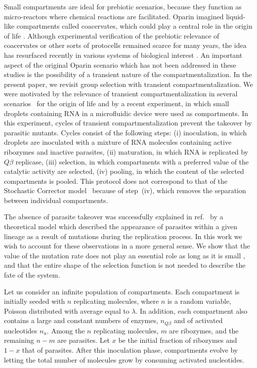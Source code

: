 \documentclass[twocolumn,showpacs,floatfix]{revtex4-1}
\begin{document}
Small compartments are ideal for prebiotic scenarios, because they function as micro-reactors where chemical reactions are facilitated. 
Oparin imagined liquid-like compartments called coacervates, which could play a central role in the origin of life \cite{Oparin1952}. 
Although experimental verification of the prebiotic relevance of coacervates or other sorts of protocells remained 
scarce for many years, the idea has resurfaced recently in various systems of biological interest \cite{Zwicker2017,Brangwynne2009}. 
An important aspect of the original Oparin scenario which has not been addressed in these studies is the possibility of a transient nature of the compartmentalization. In the present paper, we revisit group selection with transient compartmentalization. 
We were motivated by the relevance of transient compartmentalization in several 
scenarios~\cite{hydrovent,vesicles,clusters,Damer2015,Baaske2007} for the origin of life and 
by a recent experiment, in which small droplets 
containing RNA in a microfluidic device \cite{Matsumura2016} were used as compartments.
In this experiment, cycles of transient compartmentalization
 prevent the takeover by parasitic mutants.
Cycles consist of the following steps: (i) inoculation, in which droplets are inoculated with 
a mixture of RNA molecules containing active ribozymes and inactive parasites, (ii) maturation, in which RNA is replicated by $Q \beta$ replicase,  
(iii) selection, in which compartments with a preferred value of the catalytic activity are selected, 
(iv) pooling, in which the content of the selected compartments is pooled. This protocol does not correspond to that 
of the Stochastic Corrector model~\cite{Szathmary1987} because of step~(iv), which removes the separation between individual compartments.


The absence of parasite takeover was successfully explained in ref.~\cite{Matsumura2016}
by a theoretical model which described the appearance of parasites within 
a given lineage as a result of mutations during the replication process. 
In this work we wish to account for these observations in a more general sense. 
We show that the value of the mutation rate does not play an essential 
role as long as it is small \cite{SM}, 
and that the entire shape of the selection function 
is not needed to describe the fate of the system. 


Let us consider an infinite population of compartments. Each compartment is 
initially seeded with $n$ replicating molecules, where $n$ is a random
variable, Poisson distributed with average equal to $\lambda$. 
In addition, each compartment also contains a large and constant  
numbers of enzymes, $n_{Q \beta}$ and of activated nucleotides $n_u$.
Among the $n$ replicating molecules, 
$m$ are ribozymes, and the remaining $n-m$ are parasites.
Let $x$ be the initial fraction of ribozymes and $1-x$ that of parasites. After this 
inoculation phase, compartments evolve by letting the total number of molecules 
grow by consuming activated nucleotides. 
\end{document}
